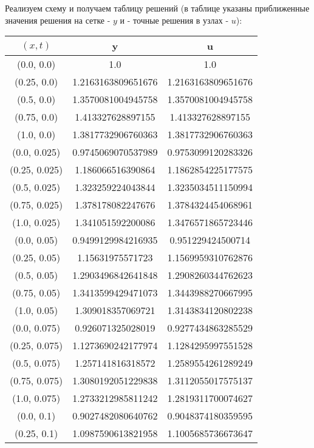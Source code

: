 Реализуем схему и получаем таблицу решений (в таблице указаны приближенные значения решения на сетке - $y$ и - точные решения в узлах - $u$):
\tiny
\begin{table}[H]
\begin{tabular}{|c|c|c|}
\hline
$(x,t)$ &  y & u \\
\hline
(0.0, 0.0) & 1.0 & 1.0 \\
\hline
(0.25, 0.0) & 1.2163163809651676 & 1.2163163809651676 \\
\hline
(0.5, 0.0) & 1.3570081004945758 & 1.3570081004945758 \\
\hline
(0.75, 0.0) & 1.413327628897155 & 1.413327628897155 \\
\hline
(1.0, 0.0) & 1.3817732906760363 & 1.3817732906760363 \\
\hline
\hline
(0.0, 0.025) & 0.9745069070537989 & 0.9753099120283326 \\
\hline
(0.25, 0.025) & 1.186066516390864 & 1.1862854225177575 \\
\hline
(0.5, 0.025) & 1.323259224043844 & 1.3235034511150994 \\
\hline
(0.75, 0.025) & 1.378178082247676 & 1.3784324454068961 \\
\hline
(1.0, 0.025) & 1.341051592200086 & 1.3476571865723446 \\
\hline
\hline
(0.0, 0.05) & 0.9499129984216935 & 0.951229424500714 \\
\hline
(0.25, 0.05) & 1.15631975571723 & 1.1569959310762876 \\
\hline
(0.5, 0.05) & 1.2903496842641848 & 1.2908260344762623 \\
\hline
(0.75, 0.05) & 1.3413599429471073 & 1.3443988270667995 \\
\hline
(1.0, 0.05) & 1.309018357069721 & 1.3143834120802238 \\
\hline
\hline
(0.0, 0.075) & 0.926071325028019 & 0.9277434863285529 \\
\hline
(0.25, 0.075) & 1.1273690242177974 & 1.1284295997551528 \\
\hline
(0.5, 0.075) & 1.257141816318572 & 1.2589554261289249 \\
\hline
(0.75, 0.075) & 1.3080192051229838 & 1.3112055017575137 \\
\hline
(1.0, 0.075) & 1.2733212985811242 & 1.2819311700074627 \\
\hline
\hline
(0.0, 0.1) & 0.9027482080640762 & 0.9048374180359595 \\
\hline
(0.25, 0.1) & 1.0987590613821958 & 1.1005685736673647 \\

\end{tabular}
\end{table}
